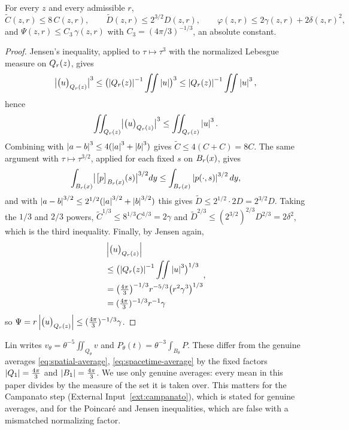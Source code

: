 \documentclass[11pt,reqno]{amsart}
\begin{document}
\begin{lemma}\label{lem:excess-vs}
For every $z$ and every admissible $r$,
\begin{equation}\label{eq:excess-vs-CD}
  \widetilde C(z,r)\le 8\,C(z,r),
  \qquad
  \widetilde D(z,r)\le 2^{3/2}D(z,r),
  \qquad
  \varphi(z,r)\le2\gamma(z,r)+2\delta(z,r)^{2},
\end{equation}
and $\Psi(z,r)\le C_{3}\,\gamma(z,r)$ with $C_{3}=(4\pi/3)^{-1/3}$, an absolute
constant.
\end{lemma}

\begin{proof}
Jensen's inequality, applied to $\tau\mapsto\tau^{3}$ with the normalized
Lebesgue measure on $Q_{r}(z)$, gives
\[
\bigl|\bigl(u\bigr)_{Q_{r}(z)}\bigr|^{3}
 \le\bigl(\left\lvert Q_{r}(z) \right\rvert^{-1}\iint\left\lvert u \right\rvert\bigr)^{3}
 \le\left\lvert Q_{r}(z) \right\rvert^{-1}\iint\left\lvert u \right\rvert^{3}
,
\] hence
\[
\iint_{Q_{r}(z)}\bigl|\bigl(u\bigr)_{Q_{r}(z)}\bigr|^{3}\le\iint_{Q_{r}(z)}\left\lvert u \right\rvert^{3}
.
\]
Combining with $\left\lvert a-b \right\rvert^{3}\le4(\left\lvert a \right\rvert^{3}+\left\lvert b \right\rvert^{3})$ gives
$\widetilde C\le4(C+C)=8C$. The same argument with $\tau\mapsto\tau^{3/2}$,
applied for each fixed $s$ on $B_{r}(x)$, gives
\[
\int_{B_{r}(x)}\bigl|\bigl[p\bigr]_{B_{r}(x)}(s)\bigr|^{3/2}dy
 \le\int_{B_{r}(x)}\left\lvert p(\cdot,s) \right\rvert^{3/2}dy
,
\] and with
$\left\lvert a-b \right\rvert^{3/2}\le2^{1/2}(\left\lvert a \right\rvert^{3/2}+\left\lvert b \right\rvert^{3/2})$ this gives
$\widetilde D\le2^{1/2}\cdot2D=2^{3/2}D$. Taking the $1/3$ and $2/3$ powers,
$\widetilde C^{1/3}\le8^{1/3}C^{1/3}=2\gamma$ and
$\widetilde D^{2/3}\le(2^{3/2})^{2/3}D^{2/3}=2\delta^{2}$, which is the third
inequality. Finally, by Jensen again,
\[
\begin{aligned}
&\left\lvert \bigl(u\bigr)_{Q_{r}(z)} \right\rvert
\\ &\le\bigl(\left\lvert Q_{r}(z) \right\rvert^{-1}\iint\left\lvert u \right\rvert^{3}\bigr)^{1/3}
\\ &=\bigl(\tfrac{4\pi}{3}\bigr)^{-1/3}r^{-5/3}\bigl(r^{2}\gamma^{3}\bigr)^{1/3}
\\ &=(\tfrac{4\pi}{3})^{-1/3}r^{-1}\gamma
\end{aligned}
,
\] so
$\Psi=r\left\lvert \bigl(u\bigr)_{Q_{r}(z)} \right\rvert\le(\tfrac{4\pi}{3})^{-1/3}\gamma$.
\end{proof}

\begin{remark}\label{rem:no-lin-normalization}
Lin \cite{Lin1998} writes $v_{\theta}=\theta^{-5}\iint_{Q_{\theta}}v$ and
$P_{\theta}(t)=\theta^{-3}\int_{B_{\theta}}P$. These differ from the genuine
averages \eqref{eq:spatial-average}, \eqref{eq:spacetime-average} by the fixed
factors $\left\lvert Q_{1} \right\rvert=\tfrac{4\pi}{3}$ and $\left\lvert B_{1} \right\rvert=\tfrac{4\pi}{3}$. We use
only genuine averages: every mean in this paper divides by the measure of the
set it is taken over. This matters for the Campanato step
(External Input~\ref{ext:campanato}), which is stated for genuine averages, and
for the Poincar\'e and Jensen inequalities, which are false with a mismatched
normalizing factor.
\end{remark}
\end{document}
